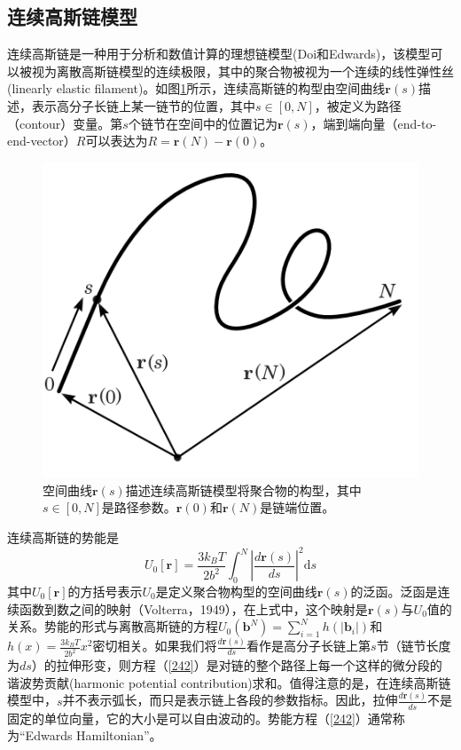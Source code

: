 \subsection{连续高斯链模型}
\author{gx}

连续高斯链是一种用于分析和数值计算的理想链模型(Doi和Edwards)，该模型可以被视为离散高斯链模型的连续极限，其中的聚合物被视为一个连续的线性弹性丝(linearly elastic filament)。如图\ref{空间曲线描述聚合物构型}所示，连续高斯链的构型由空间曲线$\mathbf{r}(s)$描述，表示高分子长链上某一链节的位置，其中$s\in [0,N]$，被定义为路径（contour）变量。第$s$个链节在空间中的位置记为$\mathbf{r}(s)$，端到端向量（end-to-end-vector）$R$可以表达为$R=\mathbf{r}(N)−\mathbf{r}(0)$。
\begin{figure}[H]
\centering
\includegraphics[scale=0.5]{./figures/41.png}
\caption{空间曲线$\mathbf{r}(s)$描述连续高斯链模型将聚合物的构型，其中$s\in [0,N]$是路径参数。$\mathbf{r}(0)$和$\mathbf{r}(N)$是链端位置。}
\label{空间曲线描述聚合物构型}
\end{figure}

连续高斯链的势能是
\begin{equation}
U_0[\mathbf{r}]=\frac{3k_BT}{2b^2}\int_{0}^{N} \left| \frac{d\mathbf{r}(s)}{ds} \right|^2\mathrm{d}s \label{242}
\end{equation}
其中$U_0[\mathbf{r}]$的方括号表示$U_0$是定义聚合物构型的空间曲线$\mathbf{r}(s)$的泛函。泛函是连续函数到数之间的映射（Volterra，1949），在上式中，这个映射是$\mathbf{r}(s)$与$U_0$值的关系。势能的形式与离散高斯链的方程$U_0(\mathbf b^N)=\sum_{i=1}^{N}h(\left|\mathbf{b}_i\right|)$和$h(x)=\frac{3k_BT}{2b^2}x^2$密切相关。如果我们将$\frac{d\mathbf{r}(s)}{ds}$看作是高分子长链上第$s$节（链节长度为$ds$）的拉伸形变，则方程（\ref{242}）是对链的整个路径上每一个这样的微分段的谐波势贡献(harmonic potential contribution)求和。值得注意的是，在连续高斯链模型中，$s$并不表示弧长，而只是表示链上各段的参数指标。因此，拉伸$\frac{d\mathbf{r}(s)}{ds}$不是固定的单位向量，它的大小是可以自由波动的。势能方程（\ref{242}）通常称为“Edwards Hamiltonian”。

